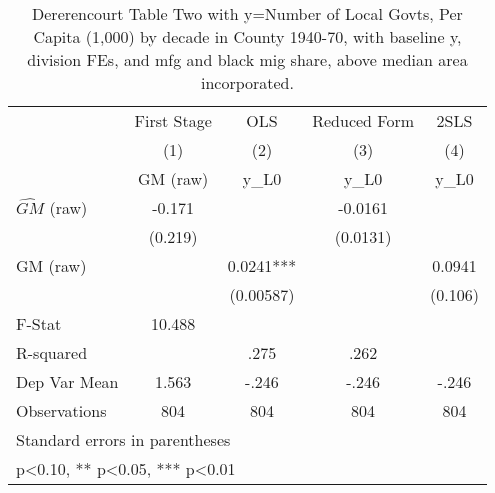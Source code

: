 \begin{table}[htbp]\centering
\def\sym#1{\ifmmode^{#1}\else\(^{#1}\)\fi}
\caption{Dererencourt Table Two with y=Number of Local Govts, Per Capita (1,000) by decade in County 1940-70, with baseline y, division FEs, and mfg and black mig share, above median area incorporated.}
\begin{tabular}{l*{4}{c}}
\toprule
                    & First Stage   &         OLS   &Reduced Form   &        2SLS   \\
                    &\multicolumn{1}{c}{(1)}&\multicolumn{1}{c}{(2)}&\multicolumn{1}{c}{(3)}&\multicolumn{1}{c}{(4)}\\
                    &\multicolumn{1}{c}{GM  (raw)}&\multicolumn{1}{c}{y\_L0}&\multicolumn{1}{c}{y\_L0}&\multicolumn{1}{c}{y\_L0}\\
\midrule
$\hat{GM}$ (raw)    &      -0.171   &               &     -0.0161   &               \\
                    &     (0.219)   &               &    (0.0131)   &               \\
\addlinespace
GM  (raw)           &               &      0.0241***&               &      0.0941   \\
                    &               &   (0.00587)   &               &     (0.106)   \\
\midrule
F-Stat              &      10.488   &               &               &               \\
R-squared           &               &        .275   &        .262   &               \\
Dep Var Mean        &       1.563   &       -.246   &       -.246   &       -.246   \\
Observations        &         804   &         804   &         804   &         804   \\
\bottomrule
\multicolumn{5}{l}{\footnotesize Standard errors in parentheses}\\
\multicolumn{5}{l}{\footnotesize * p<0.10, ** p<0.05, *** p<0.01}\\
\end{tabular}
\end{table}
